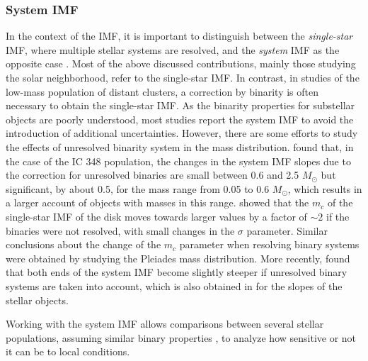 \documentclass[12pt]{article}
\begin{document}
\subsubsection{System IMF}
In the context of the IMF, it is important to distinguish between the \textit{single-star} IMF, where multiple stellar systems are resolved, and the \textit{system} IMF as the opposite case \citep[e.g. ][]{Chabrier2003b}. Most of the above discussed contributions, mainly those studying the solar neighborhood, refer to the single-star IMF. In contrast, in studies of the low-mass population of distant clusters, a correction by binarity is often necessary to obtain the single-star IMF. As the binarity properties for substellar objects are poorly understood, most studies report the system IMF to avoid the introduction of additional uncertainties. However, there are some efforts to study the effects of unresolved binarity system in the mass distribution. \citet{Luhman1998} found that, in the case of the IC 348 population, the changes in the system IMF slopes due to the correction for unresolved binaries are small between 0.6 and 2.5 $M_\odot$ but significant, by about 0.5, for the mass range from 0.05 to 0.6 $M_\odot$, which results in a larger account of objects with masses in this range. \citet{Chabrier2003b} showed that the $m_c$ of the single-star IMF of the disk moves towards larger values by a factor of $\sim 2$ if the binaries were not resolved, with small changes in the $\sigma$ parameter. Similar conclusions about the change of the $m_c$ parameter when resolving binary systems were obtained by \citet{Moraux2003} studying the Pleiades mass distribution. More recently, \citet{Muzic2017} found that both ends of the system IMF become slightly steeper if unresolved binary systems are taken into account, which is also obtained in \citet{Kroupa2001b} for the slopes of the stellar objects.%

Working with the system IMF allows comparisons between several stellar populations, assuming similar binary properties \citep{Duchene2018}, to analyze how sensitive or not it can be to local conditions.
\end{document}
